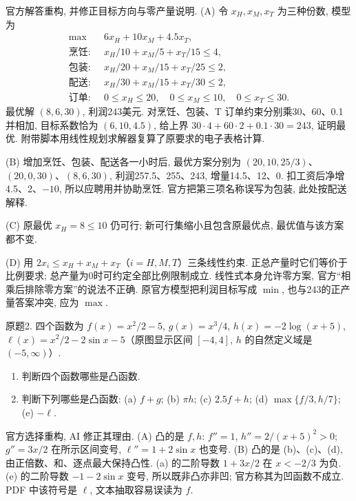 \begin{solution}
官方解答重构, 并修正目标方向与零产量说明. (A) 令 $x_H,x_M,x_T$ 为三种份数, 模型为
\begin{align*}
\max\quad&6x_H+10x_M+4.5x_T,\\
\text{烹饪: }&x_H/10+x_M/5+x_T/15\le4,\\
\text{包装: }&x_H/20+x_M/15+x_T/25\le2,\\
\text{配送: }&x_H/30+x_M/15+x_T/30\le2,\\
\text{订单: }&0\le x_H\le20,\quad0\le x_M\le10,\quad0\le x_T\le30.
\end{align*}
最优解 $(8,6,30)$, 利润243美元. 对烹饪、包装、T 订单约束分别乘30、60、0.1并相加, 目标系数恰为 $(6,10,4.5)$, 给上界 $30\cdot4+60\cdot2+0.1\cdot30=243$, 证明最优. 附带脚本用线性规划求解器复算了原要求的电子表格计算.

(B) 增加烹饪、包装、配送各一小时后, 最优方案分别为 $(20,10,25/3)$、$(20,0,30)$、$(8,6,30)$, 利润257.5、255、243, 增量14.5、12、0. 扣工资后净增4.5、2、$-10$, 所以应聘用并协助烹饪. 官方把第三项名称误写为包装, 此处按配送解释.

(C) 原最优 $x_H=8\le10$ 仍可行; 新可行集缩小且包含原最优点, 最优值与该方案都不变.

(D) 用 $2x_i\le x_H+x_M+x_T$（$i=H,M,T$）三条线性约束. 正总产量时它们等价于比例要求; 总产量为0时可约定全部比例限制成立. 线性式本身允许零方案, 官方“相乘后排除零方案”的说法不正确. 原官方模型把利润目标写成 \(\min\), 也与243的正产量答案冲突, 应为 \(\max\).
\end{solution}

\begin{exercise}\label{ass:15053-rec1-q2}
原题2. 四个函数为 $f(x)=x^2/2-5$, $g(x)=x^3/4$, $h(x)=-2\log(x+5)$, $\ell(x)=x^2/2-2\sin x-5$（原图显示区间 $[-4,4]$, $h$ 的自然定义域是 $(-5,\infty)$）.
\begin{enumerate}[label=(\Alph*)]
\item 判断四个函数哪些是凸函数.
\item 判断下列哪些是凸函数: (a) $f+g$; (b) $\pi h$; (c) $2.5f+h$; (d) $\max\{f/3,h/7\}$; (e) $-\ell$.
\end{enumerate}
\end{exercise}
\begin{solution}
官方选择重构, AI 修正其理由. (A) 凸的是 $f,h$: $f''=1$, $h''=2/(x+5)^2>0$; $g''=3x/2$ 在所示区间变号, $\ell''=1+2\sin x$ 也变号. (B) 凸的是 (b)、(c)、(d), 由正倍数、和、逐点最大保持凸性. (a) 的二阶导数 $1+3x/2$ 在 $x<-2/3$ 为负. (e) 的二阶导数 $-1-2\sin x$ 变号, 所以既非凸亦非凹; 官方称其为凹函数不成立. PDF 中该符号是 $\ell$, 文本抽取容易误读为 $f$.
\end{solution}

